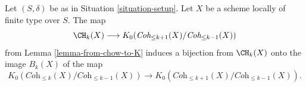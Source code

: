 \begin{lemma}
\label{lemma-cycles-rational-equivalence-K-group}
Let $(S, \delta)$ be as in Situation \ref{situation-setup}.
Let $X$ be a scheme locally of finite type over $S$.
The map
$$
\CH_k(X) \longrightarrow
K_0(\textit{Coh}_{\leq k + 1}(X)/\textit{Coh}_{\leq k - 1}(X))
$$
from Lemma \ref{lemma-from-chow-to-K} induces a bijection from
$\CH_k(X)$ onto the image $B_k(X)$ of the map
$$
K_0(\textit{Coh}_{\leq k}(X)/\textit{Coh}_{\leq k - 1}(X))
\longrightarrow
K_0(\textit{Coh}_{\leq k + 1}(X)/\textit{Coh}_{\leq k - 1}(X)).
$$
\end{lemma}